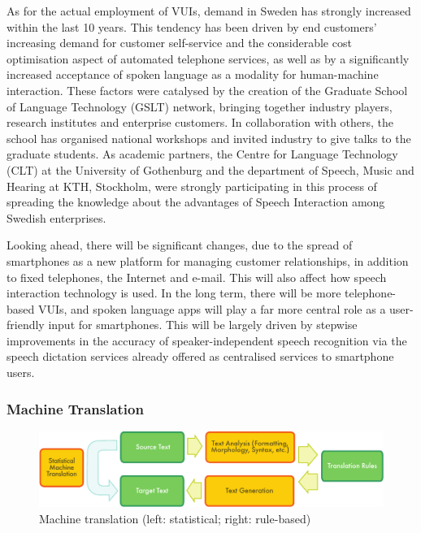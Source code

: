 \begin{multicols}{2}
As for the actual employment of VUIs, demand in Sweden has strongly
increased within the last 10 years. This tendency has been driven by
end customers’ increasing demand for customer self-service and the
considerable cost optimisation aspect of automated telephone services,
as well as by a significantly increased acceptance of spoken language
as a modality for human-machine interaction. These factors were
catalysed by the creation of the Graduate School of Language
Technology (GSLT) network, bringing together industry players,
research institutes and enterprise customers. In collaboration with
others, the school has organised national workshops and invited
industry to give talks to the graduate students. As academic partners,
the Centre for Language Technology (CLT) at the University of
Gothenburg and the department of Speech, Music and Hearing at KTH,
Stockholm, were strongly participating in this process of spreading
the knowledge about the advantages of Speech Interaction among Swedish
enterprises.

Looking ahead, there will be significant changes, due to the spread of
smartphones as a new platform for managing customer relationships, in
addition to fixed telephones, the Internet and e-mail. This will also
affect how speech interaction technology is used. In the long term,
there will be more telephone-based VUIs, and spoken language apps will
play a far more central role as a user-friendly input for
smartphones. This will be largely driven by stepwise improvements in
the accuracy of speaker-independent speech recognition via the speech
dictation services already offered as centralised services to
smartphone users.

\subsubsection{Machine Translation}

\begin{figure}[htb]
  \center
  \includegraphics[width=\textwidth]{../_media/english/machine_translation}
  \caption{Machine translation (left: statistical; right: rule-based)}
  \label{fig:mtarch_en}
\end{figure}



\end{multicols}
